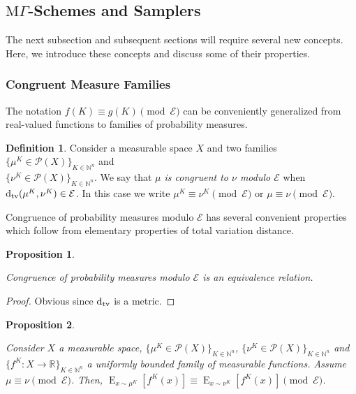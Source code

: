 \documentclass{article}
\numberwithin{equation}{section}
\theoremstyle{definition}
\newtheorem{definition}{Definition}[section]
\theoremstyle{plain}
\newtheorem{proposition}{Proposition}[section]
\DeclareMathOperator{\E}{E}
\newcommand{\Dtv}{\operatorname{d}_{\textnormal{tv}}}
\newcommand{\Nats}{\mathbb{N}}
\newcommand{\Reals}{\mathbb{R}}
\newcommand{\MGrow}{\mathrm{M}\Gamma}
\newcommand{\Fall}{\mathcal{E}}
\begin{document}
\subsection{\texorpdfstring{$\MGrow$}{MΓ}-Schemes and Samplers}

The next subsection and subsequent sections will require several new concepts. Here, we introduce these concepts and discuss some of their properties.

\subsubsection{Congruent Measure Families}

The notation $f(K) \equiv g(K) \pmod \Fall$ can be conveniently generalized from real-valued functions to families of probability measures.

\begin{samepage}
\begin{definition}

Consider a measurable space $X$ and two families $\{\mu^K \in \mathcal{P}(X)\}_{K \in \Nats^n}$ and\\ $\{\nu^K \in \mathcal{P}(X)\}_{K \in \Nats^n}$. We say that \emph{$\mu$ is congruent to $\nu$ modulo $\Fall$} when $\Dtv(\mu^K,\nu^K) \in \Fall$. In this case we write $\mu^K \equiv \nu^K \pmod \Fall$ or $\mu \equiv \nu \pmod \Fall$.

\end{definition}
\end{samepage}

Congruence of probability measures modulo $\Fall$ has several convenient properties which follow from elementary properties of total variation distance.

\begin{samepage}
\begin{proposition}
\label{prp:prob_cong_eq}

Congruence of probability measures modulo $\Fall$ is an equivalence relation.

\end{proposition}
\end{samepage}

\begin{proof}

Obvious since $\Dtv$ is a metric.
\end{proof}

\begin{samepage}
\begin{proposition}
\label{prp:prob_cong_ev}

Consider $X$ a measurable space, $\{\mu^K \in \mathcal{P}(X)\}_{K \in \Nats^n}$, $\{\nu^K \in \mathcal{P}(X)\}_{K \in \Nats^n}$ and ${\{f^K: X \rightarrow \Reals\}_{K \in \Nats^n}}$ a uniformly bounded family of measurable functions. Assume ${\mu \equiv \nu \pmod \Fall}$. Then, $\E_{x \sim \mu^K}[f^K(x)] \equiv \E_{x \sim \nu^K}[f^K(x)] \pmod \Fall$.

\end{proposition}
\end{samepage}
\end{document}
